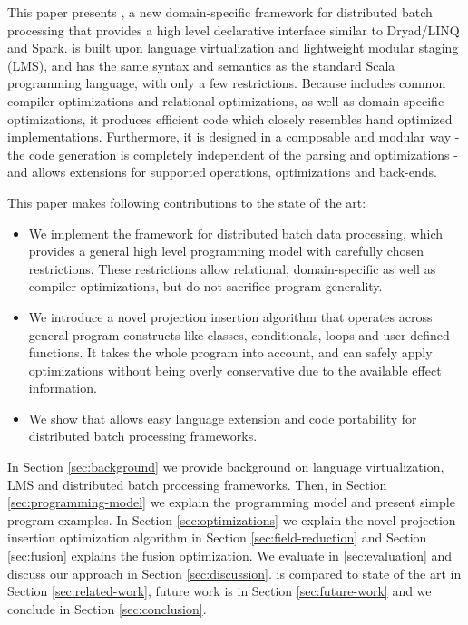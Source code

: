 This paper presents \tool, a new domain-specific framework for distributed batch
processing that provides a high level declarative interface similar to
Dryad/LINQ and Spark. \tool is built upon language virtualization
\cite{moors_scala-virtualized_2012} and lightweight modular staging
\cite{rompf_lightweight_2010} (LMS), and has the same syntax and semantics as the
standard Scala programming language, with only a few restrictions.
Because \tool includes common compiler optimizations and relational optimizations, as well as
domain-specific optimizations, it produces efficient code which closely resembles hand
optimized implementations.
Furthermore, it is designed in a composable and modular way - the code generation is
completely independent of the parsing and optimizations - and allows extensions
for supported operations, optimizations and back-ends.

This paper makes following contributions to the state of the art:
\begin{itemize}

  \item We implement the \tool framework for distributed batch data
  processing, which provides a general high level programming model with carefully
  chosen restrictions. These restrictions allow relational, domain-specific as well as
  compiler optimizations, but do not sacrifice program generality.

  \item We introduce a novel projection insertion algorithm that operates across
  general program constructs like classes, conditionals, loops and user defined
  functions. It takes the whole program into account, and can safely apply optimizations 
  without being overly conservative due to the available effect information.

  \item We show that \tool allows easy language extension and code portability
  for distributed batch processing frameworks.

\end{itemize} 

In Section \ref{sec:background} we provide background on language
virtualization, LMS and distributed batch processing frameworks. Then,
in Section \ref{sec:programming-model} we explain the programming model and present simple
program examples. In Section \ref{sec:optimizations} we explain the novel
projection insertion optimization algorithm in Section \ref{sec:field-reduction}
and Section \ref{sec:fusion} explains the fusion optimization. We evaluate \tool
in \ref{sec:evaluation} and discuss our approach in Section
\ref{sec:discussion}. \tool is compared to state of the art in Section
\ref{sec:related-work}, future work is in Section \ref{sec:future-work} and we
conclude in Section \ref{sec:conclusion}.
